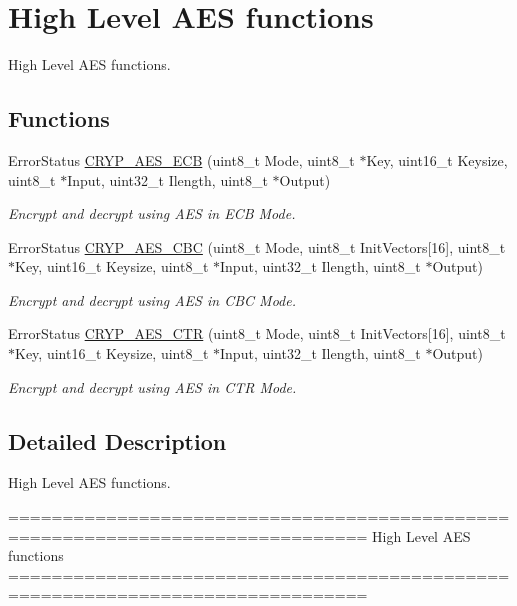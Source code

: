 \hypertarget{group___c_r_y_p___group6}{\section{High Level A\-E\-S functions}
\label{group___c_r_y_p___group6}
}


High Level A\-E\-S functions.  


\subsection*{Functions}
\begin{DoxyCompactItemize}
\item 
Error\-Status \hyperlink{group___c_r_y_p___group6_ga79ff82ece0e9620dc86d6e57abe639e1}{C\-R\-Y\-P\-\_\-\-A\-E\-S\-\_\-\-E\-C\-B} (uint8\-\_\-t Mode, uint8\-\_\-t $\ast$Key, uint16\-\_\-t Keysize, uint8\-\_\-t $\ast$Input, uint32\-\_\-t Ilength, uint8\-\_\-t $\ast$Output)
\begin{DoxyCompactList}\small\item\em Encrypt and decrypt using A\-E\-S in E\-C\-B Mode. \end{DoxyCompactList}\item 
Error\-Status \hyperlink{group___c_r_y_p___group6_gaa43eadf707257710f6a53b3295b39d70}{C\-R\-Y\-P\-\_\-\-A\-E\-S\-\_\-\-C\-B\-C} (uint8\-\_\-t Mode, uint8\-\_\-t Init\-Vectors\mbox{[}16\mbox{]}, uint8\-\_\-t $\ast$Key, uint16\-\_\-t Keysize, uint8\-\_\-t $\ast$Input, uint32\-\_\-t Ilength, uint8\-\_\-t $\ast$Output)
\begin{DoxyCompactList}\small\item\em Encrypt and decrypt using A\-E\-S in C\-B\-C Mode. \end{DoxyCompactList}\item 
Error\-Status \hyperlink{group___c_r_y_p___group6_ga2f36aea6e94452e5e5e938547fb89d4c}{C\-R\-Y\-P\-\_\-\-A\-E\-S\-\_\-\-C\-T\-R} (uint8\-\_\-t Mode, uint8\-\_\-t Init\-Vectors\mbox{[}16\mbox{]}, uint8\-\_\-t $\ast$Key, uint16\-\_\-t Keysize, uint8\-\_\-t $\ast$Input, uint32\-\_\-t Ilength, uint8\-\_\-t $\ast$Output)
\begin{DoxyCompactList}\small\item\em Encrypt and decrypt using A\-E\-S in C\-T\-R Mode. \end{DoxyCompactList}\end{DoxyCompactItemize}


\subsection{Detailed Description}
High Level A\-E\-S functions. \begin{DoxyVerb} ===============================================================================
                          High Level AES functions
 ===============================================================================\end{DoxyVerb}
 

